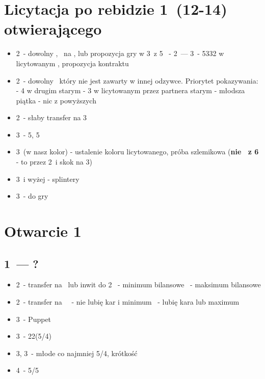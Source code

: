 \documentclass[12pt, a4paper]{article}
\begin{document}
\section{Licytacja po rebidzie 1\ntx\ (12-14) otwierającego}
\begin{itemize}
    \item 2\clubs\ - dowolny \inv, \soff\ na \diams, lub propozycja gry w 3\nt\ z 5\major
    \clubs\ - 2\diams\ --- 3\nt\ - 5332 w licytowanym \major, propozycja kontraktu
    \item 2\diams\ - dowolny \gf\, który nie jest zawarty w innej odzywce.
    Priorytet pokazywania:
    \subitem - 4 w drugim starym
    \subitem - 3 w licytowanym przez partnera starym
    \subitem - młodsza piątka
    \subitem - nic z powyższych
    \item 2\nt\ - słaby transfer na 3\clubs
    \item 3\minor\ - 5\major, 5\minor\ \gf\
    \item 3\hearts\ (w nasz kolor) - ustalenie koloru licytowanego, próba szlemikowa
        (\textbf{nie \inv\ z 6} - to przez 2\clubs\ i skok na 3\major)
    \item 3\spades\ i wyżej - splintery
    \item 3\nt\ - do gry
\end{itemize}



\pagebreak
\section{Otwarcie 1\ntx}
\subsection{1\ntx\ --- ?}
\begin{itemize}
    \item 2\spades\ - transfer na \clubs\ lub inwit do 2\nt
    \nt\ - minimum bilansowe
    \clubs\ - maksimum bilansowe
    \item 2\nt\ - transfer na \diams\
    \clubs\ - nie lubię kar i minimum
    \subitem 3\diams\ - lubię kara lub maximum
    \item 3\clubs\ - Puppet
    \item 3\diams\ - 22(5/4)
    \item 3\hearts, 3\spades\ - młode co najmniej 5/4, krótkość
    \item 4\clubs\ - 5/5 \major\
\end{itemize}
\end{document}
